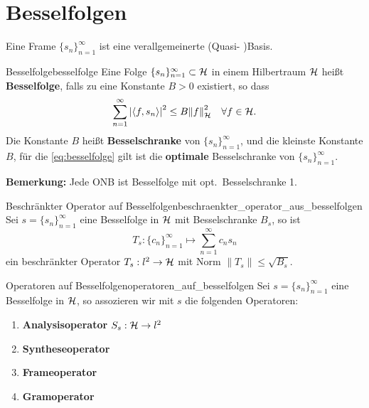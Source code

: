 \section{Besselfolgen}

Eine Frame ${\{s_n\}}_{n=1}^\infty$ ist eine verallgemeinerte (Quasi- )Basis.

\begin{boringDef}{Besselfolge}{besselfolge}
  Eine Folge $\{s_n\}_{n=1}^\infty \subset \mathcal{H}$ in einem Hilbertraum $\mathcal{H}$ heißt \textbf{Besselfolge}, falls zu eine Konstante $B > 0$ existiert, so dass
  \begin{equation}
    \sum\limits_{n=1}^\infty \left|\langle f, s_n \rangle\right|^2 \leq B {\|f\|}_{\mathcal{H}}^{2} \quad \forall f \in \mathcal{H}.\label{eq:besselfolge}
  \end{equation}
  Die Konstante $B$ heißt \textbf{Besselschranke} von ${\{s_n\}}_{n=1}^\infty$, und die kleinste Konstante $B$, für die \eqref{eq:besselfolge} gilt ist die \textbf{optimale} Besselschranke von ${\{s_n\}}_{n=1}^\infty$.

  \textbf{Bemerkung:} Jede ONB ist Besselfolge mit opt.\ Besselschranke 1.
\end{boringDef}

\begin{mytheo}{Beschränkter Operator auf Besselfolgen}{beschraenkter_operator_aus_besselfolgen}
  Sei $s = {\{s_n\}}_{n=1}^\infty$ eine Besselfolge in $\mathcal{H}$ mit Besselschranke $B_s$, so ist
  \begin{equation*}
    T_s : {\{c_n\}}_{n=1}^\infty \mapsto \sum\limits_{n=1}^\infty c_n s_n
  \end{equation*}
  ein beschränkter Operator $T_s : l^2 \to \mathcal{H}$ mit Norm $\|T_s\| \leq \sqrt{B_s}$.
\end{mytheo}

\begin{boringDef}{Operatoren auf Besselfolgen}{operatoren_auf_besselfolgen}
  Sei $s = {\{s_n\}}_{n=1}^\infty$ eine Besselfolge in $\mathcal{H}$, so assozieren wir mit $s$ die folgenden Operatoren:
  \begin{enumerate}
    \item \textbf{Analysisoperator} $S_s : \mathcal{H} \to l^2$
    \item \textbf{Syntheseoperator}
    \item \textbf{Frameoperator}
    \item \textbf{Gramoperator}
  \end{enumerate}
\end{boringDef}

